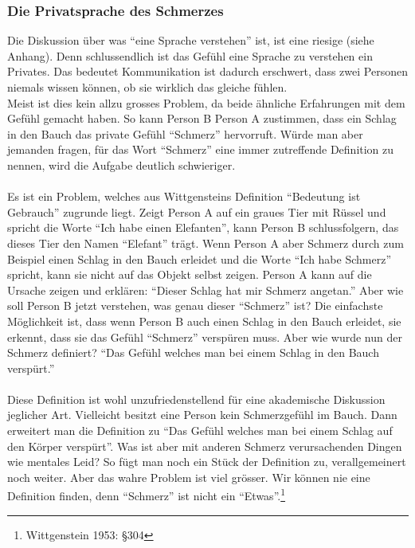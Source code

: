 \documentclass[10pt,a4paper]{article}
\begin{document}
\subsubsection{Die Privatsprache des Schmerzes}
Die Diskussion über was \enquote{eine Sprache verstehen} ist, ist eine riesige (siehe Anhang).
Denn schlussendlich ist das Gefühl eine Sprache zu verstehen ein Privates. Das bedeutet Kommunikation ist dadurch erschwert, dass zwei Personen niemals wissen können, ob sie wirklich das gleiche fühlen. \\
Meist ist dies kein allzu grosses Problem, da beide ähnliche Erfahrungen mit dem Gefühl gemacht haben. So kann Person B Person A zustimmen, dass ein Schlag in den Bauch das private Gefühl \enquote{Schmerz} hervorruft. Würde man aber jemanden fragen, für das Wort \enquote{Schmerz} eine immer zutreffende Definition zu nennen, wird die Aufgabe deutlich schwieriger. \\
\\
Es ist ein Problem, welches aus Wittgensteins Definition \enquote{Bedeutung ist Gebrauch} zugrunde liegt. Zeigt Person A auf ein graues Tier mit Rüssel und spricht die Worte \enquote{Ich habe einen Elefanten}, kann Person B schlussfolgern, das dieses Tier den Namen \enquote{Elefant} trägt. Wenn Person A aber Schmerz durch zum Beispiel einen Schlag in den Bauch erleidet und die Worte \enquote{Ich habe Schmerz} spricht, kann sie nicht auf das Objekt selbst zeigen. Person A kann auf die Ursache zeigen und erklären: \enquote{Dieser Schlag hat mir Schmerz angetan.} Aber wie soll Person B jetzt verstehen, was genau dieser \enquote{Schmerz} ist? Die einfachste Möglichkeit ist, dass wenn Person B auch einen Schlag in den Bauch erleidet, sie erkennt, dass sie das Gefühl \enquote{Schmerz} verspüren muss. Aber wie wurde nun der Schmerz definiert? \enquote{Das Gefühl welches man bei einem Schlag in den Bauch verspürt.} \\
\\
Diese Definition ist wohl unzufriedenstellend für eine akademische Diskussion jeglicher Art. Vielleicht besitzt eine Person kein Schmerzgefühl im Bauch. Dann erweitert man die Definition zu \enquote{Das Gefühl welches man bei einem Schlag auf den Körper verspürt}. Was ist aber mit anderen Schmerz verursachenden Dingen wie mentales Leid? So fügt man noch ein Stück der Definition zu, verallgemeinert noch weiter. Aber das wahre Problem ist viel grösser. Wir können nie eine Definition finden, denn \enquote{Schmerz} ist nicht ein \enquote{Etwas}.\footnote{Wittgenstein 1953: §304}
\end{document}
